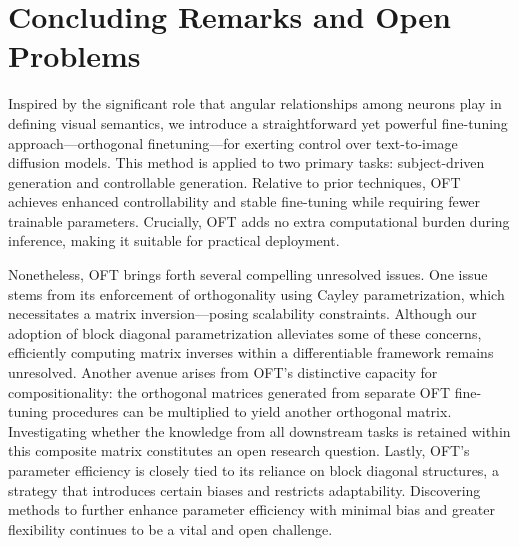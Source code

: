 \section{Concluding Remarks and Open Problems}

Inspired by the significant role that angular relationships among neurons play in defining visual semantics, we introduce a straightforward yet powerful fine-tuning approach—orthogonal finetuning—for exerting control over text-to-image diffusion models. This method is applied to two primary tasks: subject-driven generation and controllable generation. Relative to prior techniques, OFT achieves enhanced controllability and stable fine-tuning while requiring fewer trainable parameters. Crucially, OFT adds no extra computational burden during inference, making it suitable for practical deployment.

Nonetheless, OFT brings forth several compelling unresolved issues. One issue stems from its enforcement of orthogonality using Cayley parametrization, which necessitates a matrix inversion—posing scalability constraints. Although our adoption of block diagonal parametrization alleviates some of these concerns, efficiently computing matrix inverses within a differentiable framework remains unresolved. Another avenue arises from OFT's distinctive capacity for compositionality: the orthogonal matrices generated from separate OFT fine-tuning procedures can be multiplied to yield another orthogonal matrix. Investigating whether the knowledge from all downstream tasks is retained within this composite matrix constitutes an open research question. Lastly, OFT’s parameter efficiency is closely tied to its reliance on block diagonal structures, a strategy that introduces certain biases and restricts adaptability. Discovering methods to further enhance parameter efficiency with minimal bias and greater flexibility continues to be a vital and open challenge.